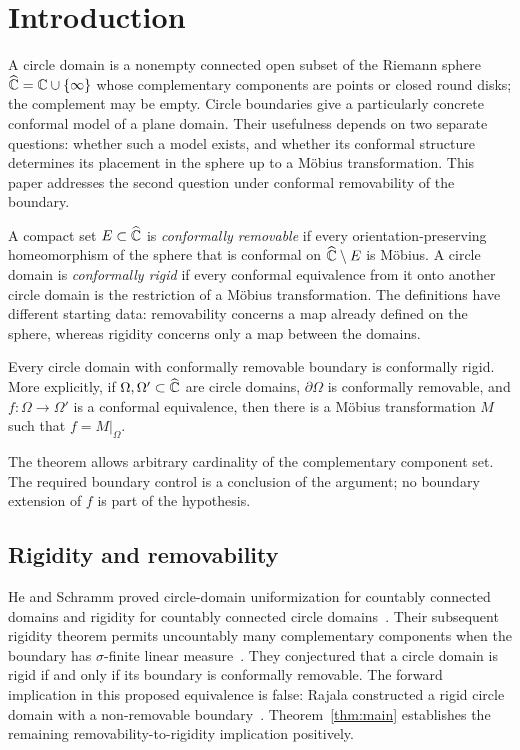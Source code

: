 \section{Introduction}

A circle domain is a nonempty connected open subset of the Riemann
sphere $\widehat{\mathbb C}=\mathbb C\cup\{\infty\}$ whose complementary components are
points or closed round disks; the complement may be empty.  Circle
boundaries give a particularly concrete conformal model of a plane
domain.  Their usefulness depends on two separate questions: whether
such a model exists, and whether its conformal structure determines
its placement in the sphere up to a M\"obius transformation.  This paper
addresses the second question under conformal removability of the
boundary.

A compact set $E\subset\widehat{\mathbb C}$ is \emph{conformally removable} if every
orientation-preserving homeomorphism of the sphere that is conformal
on $\widehat{\mathbb C}\setminus E$ is M\"obius.  A circle domain is
\emph{conformally rigid} if every conformal equivalence from it onto
another circle domain is the restriction of a M\"obius transformation.
The definitions have different starting data: removability concerns a
map already defined on the sphere, whereas rigidity concerns only a
map between the domains.

\begin{theorem}\label{thm:main}
Every circle domain with conformally removable boundary is conformally
rigid.  More explicitly, if $\Omega,\Omega'\subset\widehat{\mathbb C}$ are circle
domains, $\partial\Omega$ is conformally removable, and
$f\colon\Omega\to\Omega'$ is a conformal equivalence, then there is a
M\"obius transformation $M$ such that $f=M|_\Omega$.
\end{theorem}

The theorem allows arbitrary cardinality of the complementary component
set.  The required boundary control is a conclusion of the argument;
no boundary extension of $f$ is part of the hypothesis.

\subsection{Rigidity and removability}

He and Schramm proved circle-domain uniformization for countably
connected domains and rigidity for countably connected circle
domains~\cite{HeSchramm1993}.  Their subsequent rigidity theorem permits
uncountably many complementary components when the boundary has
$\sigma$-finite linear measure~\cite{HeSchramm1994}.  They conjectured
that a circle domain is rigid if and only if its boundary is conformally
removable.  The forward implication in this proposed equivalence is
false: Rajala constructed a rigid circle domain with a non-removable
boundary~\cite[Theorem~1.1]{Rajala2025}.  Theorem~\ref{thm:main}
establishes the remaining removability-to-rigidity implication
positively.

